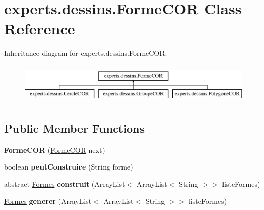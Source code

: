 \hypertarget{classexperts_1_1dessins_1_1_forme_c_o_r}{}\section{experts.\+dessins.\+Forme\+C\+OR Class Reference}
\label{classexperts_1_1dessins_1_1_forme_c_o_r}
Inheritance diagram for experts.\+dessins.\+Forme\+C\+OR\+:\begin{figure}[H]
\begin{center}
\leavevmode
\includegraphics[height=1.954625cm]{classexperts_1_1dessins_1_1_forme_c_o_r}
\end{center}
\end{figure}
\subsection*{Public Member Functions}
\begin{DoxyCompactItemize}
\item 
\mbox{\label{classexperts_1_1dessins_1_1_forme_c_o_r_a14ae3b0f1e7398e32311ea4455d68c4e}} 
{\bfseries Forme\+C\+OR} (\mbox{\hyperlink{classexperts_1_1dessins_1_1_forme_c_o_r}{Forme\+C\+OR}} next)
\item 
\mbox{\label{classexperts_1_1dessins_1_1_forme_c_o_r_ae4836b29bd45bf4b7e2174dd294e7512}} 
boolean {\bfseries peut\+Construire} (String forme)
\item 
\mbox{\label{classexperts_1_1dessins_1_1_forme_c_o_r_aa864524ad878956a1c80cac5fd7e82a0}} 
abstract \mbox{\hyperlink{classdessin_1_1_formes}{Formes}} {\bfseries construit} (Array\+List$<$ Array\+List$<$ String $>$$>$ liste\+Formes)
\item 
\mbox{\label{classexperts_1_1dessins_1_1_forme_c_o_r_ae271adecde3174d4ac1df75f99515a0c}} 
\mbox{\hyperlink{classdessin_1_1_formes}{Formes}} {\bfseries generer} (Array\+List$<$ Array\+List$<$ String $>$$>$ liste\+Formes)
\end{DoxyCompactItemize}
